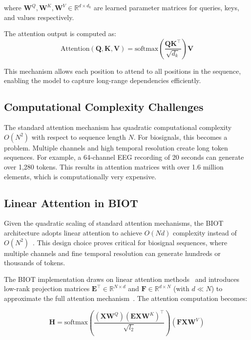where $\mathbf{W}^Q, \mathbf{W}^K, \mathbf{W}^V \in \mathbb{R}^{d \times d_k}$ are learned parameter matrices for queries, keys, and values respectively.

The attention output is computed as:
\begin{equation}
\text{Attention}(\mathbf{Q}, \mathbf{K}, \mathbf{V}) = \text{softmax}\left(\frac{\mathbf{Q}\mathbf{K}^{\top}}{\sqrt{d_k}}\right)\mathbf{V}
\end{equation}

This mechanism allows each position to attend to all positions in the sequence, enabling the model to capture long-range dependencies efficiently.

\subsection{Computational Complexity Challenges}

The standard attention mechanism has quadratic computational complexity $O(N^2)$ with respect to sequence length $N$. For biosignals, this becomes a problem. Multiple channels and high temporal resolution create long token sequences. For example, a 64-channel EEG recording of 20 seconds can generate over 1,280 tokens. This results in attention matrices with over 1.6 million elements, which is computationally very expensive.

\subsection{Linear Attention in BIOT}

Given the quadratic scaling of standard attention mechanisms, the \ac{BIOT} architecture adopts linear attention to achieve $O(Nd)$ complexity instead of $O(N^2)$~\cite{yang2023biot}. This design choice proves critical for biosignal sequences, where multiple channels and fine temporal resolution can generate hundreds or thousands of tokens.

The \ac{BIOT} implementation draws on linear attention methods~\cite{katharopoulos2020transformers} and introduces low-rank projection matrices $\mathbf{E}^{\top} \in \mathbb{R}^{N \times d}$ and $\mathbf{F} \in \mathbb{R}^{d \times N}$ (with $d \ll N$) to approximate the full attention mechanism~\cite{yang2023biot}. The attention computation becomes:

\begin{equation}
\mathbf{H} = \text{softmax}\left(\frac{(\mathbf{X}\mathbf{W}^Q)(\mathbf{E}\mathbf{X}\mathbf{W}^K)^{\top}}{\sqrt{l_2}}\right)(\mathbf{F}\mathbf{X}\mathbf{W}^V)
\end{equation}

